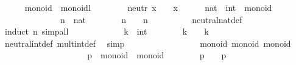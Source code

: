 \begin{isabellebody}
\begin{isamarkuptext}
\end{isamarkuptext}%
\isamarkuptrue%
\ \ \ \ \isamarkupfalse%
\ monoid\ {\isacharequal}\ monoidl\ {\isacharplus}\isanewline
\ \ \ \ \ \ \ neutr{\isacharcolon}\ {\isachardoublequoteopen}x\ {\isasymotimes}\ {\isasymone}\ {\isacharequal}\ x{\isachardoublequoteclose}\isanewline
\isanewline
\ \ \ \ \isamarkupfalse%
\ nat\ \ int\ {\isacharcolon}{\isacharcolon}\ monoid\ \isanewline
\ \ \ \ \isanewline
\isanewline
\ \ \ \ \isamarkupfalse%
%
\isadelimproof
\ %
\endisadelimproof
%
\isatagproof
{}\isamarkupfalse%
\isanewline
\ \ \ \ \ \ \isamarkupfalse%
\ n\ {\isacharcolon}{\isacharcolon}\ nat\isanewline
\ \ \ \ \ \ \isamarkupfalse%
\ {\isachardoublequoteopen}n\ {\isasymotimes}\ {\isasymone}\ {\isacharequal}\ n{\isachardoublequoteclose}\isanewline
\ \ \ \ \ \ \ \ \isamarkupfalse%
\ neutral{\isacharunderscore}nat{\isacharunderscore}def\ \isamarkupfalse%
\ {\isacharparenleft}induct\ n{\isacharparenright}\ simp{\isacharunderscore}all\isanewline
\ \ \ \ \isamarkupfalse%
\isanewline
\ \ \ \ \ \ \isamarkupfalse%
\ k\ {\isacharcolon}{\isacharcolon}\ int\isanewline
\ \ \ \ \ \ \isamarkupfalse%
\ {\isachardoublequoteopen}k\ {\isasymotimes}\ {\isasymone}\ {\isacharequal}\ k{\isachardoublequoteclose}\isanewline
\ \ \ \ \ \ \ \ \isamarkupfalse%
\ neutral{\isacharunderscore}int{\isacharunderscore}def\ mult{\isacharunderscore}int{\isacharunderscore}def\ \isamarkupfalse%
\ simp\isanewline
\ \ \ \ \isamarkupfalse%
%
\endisatagproof
{\isafoldproof}%
%
\isadelimproof
%
\endisadelimproof
\isanewline
\isanewline
\ \ \ \ \isamarkupfalse%
\isanewline
\isanewline
\ \ \ \ \isamarkupfalse%
\ {\isacharasterisk}\ {\isacharcolon}{\isacharcolon}\ {\isacharparenleft}monoid{\isacharcomma}\ monoid{\isacharparenright}\ monoid\isanewline
\ \ \ \ \isanewline
\isanewline
\ \ \ \ \isamarkupfalse%
%
\isadelimproof
\ %
\endisadelimproof
%
\isatagproof
{}\isamarkupfalse%
\ \isanewline
\ \ \ \ \ \ \isamarkupfalse%
\ p\ {\isacharcolon}{\isacharcolon}\ {\isachardoublequoteopen}{\isasymalpha}{\isasymColon}monoid\ {\isasymtimes}\ {\isasymbeta}{\isasymColon}monoid{\isachardoublequoteclose}\isanewline
\ \ \ \ \ \ \isamarkupfalse%
\ {\isachardoublequoteopen}p\ {\isasymotimes}\ {\isasymone}\ {\isacharequal}\ p{\isachardoublequoteclose}\isanewline

\end{isabellebody}
